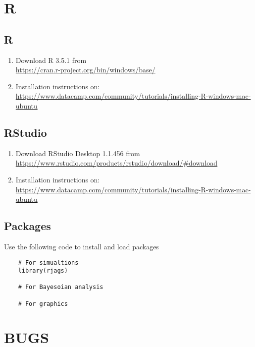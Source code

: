 \section*{R }
	\subsection*{R}
		\begin{enumerate}
		\item	Download R 3.5.1 from\\
		\href{https://cran.r-project.org/bin/windows/base/}{https://cran.r-project.org/bin/windows/base/}
		\item	Installation instructions on: \\
		\href{https://www.datacamp.com/community/tutorials/installing-R-windows-mac-ubuntu}{https://www.datacamp.com/community/tutorials/installing-R-windows-mac-ubuntu}
		\end{enumerate}
	\subsection*{RStudio}
		\begin{enumerate}
		\item	Download RStudio Desktop 1.1.456 from\\
		\href{https://www.rstudio.com/products/rstudio/download/#download}{https://www.rstudio.com/products/rstudio/download/\#download}
		\item	Installation instructions on: \\
		\href{https://www.datacamp.com/community/tutorials/installing-R-windows-mac-ubuntu}{https://www.datacamp.com/community/tutorials/installing-R-windows-mac-ubuntu}
	
		\end{enumerate}
	\subsection*{Packages}
	Use the following code to install and load packages
	\begin{lstlisting}
	# For simualtions
	library(rjags)
	
	# For Bayesoian analysis
	
	# For graphics
	\end{lstlisting}
\section*{BUGS}


